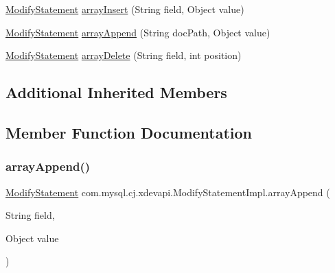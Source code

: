 \begin{DoxyCompactItemize}
\item 
\mbox{\hyperlink{interfacecom_1_1mysql_1_1cj_1_1xdevapi_1_1_modify_statement}{Modify\+Statement}} \mbox{\hyperlink{classcom_1_1mysql_1_1cj_1_1xdevapi_1_1_modify_statement_impl_a902a626ef8ba98170a0653ca3799c0c8}{array\+Insert}} (String field, Object value)
\item 
\mbox{\hyperlink{interfacecom_1_1mysql_1_1cj_1_1xdevapi_1_1_modify_statement}{Modify\+Statement}} \mbox{\hyperlink{classcom_1_1mysql_1_1cj_1_1xdevapi_1_1_modify_statement_impl_afca543cf08b9d3ad6177c9e6dfde63bd}{array\+Append}} (String doc\+Path, Object value)
\item 
\mbox{\hyperlink{interfacecom_1_1mysql_1_1cj_1_1xdevapi_1_1_modify_statement}{Modify\+Statement}} \mbox{\hyperlink{classcom_1_1mysql_1_1cj_1_1xdevapi_1_1_modify_statement_impl_ac765892bc25e09147fa11c5171a9287b}{array\+Delete}} (String field, int position)
\end{DoxyCompactItemize}
\subsection*{Additional Inherited Members}


\subsection{Member Function Documentation}
\mbox{\label{classcom_1_1mysql_1_1cj_1_1xdevapi_1_1_modify_statement_impl_afca543cf08b9d3ad6177c9e6dfde63bd}} 
\subsubsection{\texorpdfstring{array\+Append()}{arrayAppend()}}
{\footnotesize\ttfamily \mbox{\hyperlink{interfacecom_1_1mysql_1_1cj_1_1xdevapi_1_1_modify_statement}{Modify\+Statement}} com.\+mysql.\+cj.\+xdevapi.\+Modify\+Statement\+Impl.\+array\+Append (\begin{DoxyParamCaption}\item[{String}]{field,  }\item[{Object}]{value }\end{DoxyParamCaption})}

